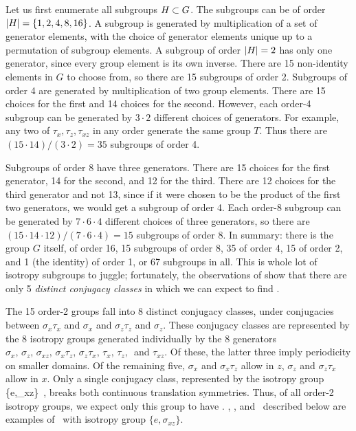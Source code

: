 Let us first enumerate all subgroups $H_{\text{\tiny }} \subset G$.
The subgroups can be of order
$|H_{\text{\tiny }}| = \{1,2,4,8,16\}$.
A subgroup is generated by multiplication of a set of
generator elements, with the choice of
generator elements unique up to a permutation of subgroup
elements.
A subgroup of order $|H_{\text{\tiny }}| =  2$ has only one generator,
since every group element is its own inverse. There are 15
non-identity elements in $G$ to choose from, so there are 15 subgroups
of order 2.
Subgroups of order 4 are generated by multiplication of two
group elements. There are 15 choices for the first and 14
choices for the second. However, each order-4 subgroup
can be generated by $3 \cdot 2$ different choices of generators.
For example, any two of $\tau_x, \tau_z, \tau_{xz}$ in any order
generate the same group $T$. Thus there are $(15 \cdot 14)/(3 \cdot 2) = 35$
subgroups of order 4.

Subgroups of order 8 have three generators.  There are
15 choices for the first generator, 14 for the second, and 12 for the
third. There are 12 choices for the third
generator and not  13, since if it were chosen to be the product of the
first two generators, we would get a subgroup of order 4.
Each order-8 subgroup can be generated
by $7 \cdot 6 \cdot 4$ different choices of three generators, so there are
$(15 \cdot 14 \cdot 12)/(7 \cdot 6 \cdot 4) = 15$ subgroups of order 8.
In summary: there is the group $G$ itself, of order 16,
15 subgroups of order 8, 35 of order 4, 15 of
order 2, and 1 (the identity) of order 1,
or 67 subgroups in all.
This is whole lot of isotropy subgroups to juggle; fortunately,
the observations of  show that there
are only 5 {\em distinct conjugacy classes} in which we can expect
to find \eqva.

The 15 order-2 groups fall into 8 distinct conjugacy
classes, under conjugacies between $\sigma_x \tau_x$ and $\sigma_x$
and $\sigma_z \tau_z$ and $\sigma_z$. These conjugacy classes are
represented by the 8 isotropy groups generated individually by the 8
generators
$\sigma_x,\, \sigma_z,\, \sigma_{xz},\, \sigma_x \tau_z,\,  \sigma_z \tau_x,\,
\tau_x,\, \tau_z,\,$ and $\tau_{xz}$. Of these, the latter three imply
periodicity on smaller domains. Of the remaining five,
$\sigma_x$ and $\sigma_x \tau_z$ allow {\reqva} in $z$,
$\sigma_z$ and $\sigma_z \tau_x$ allow {\reqva} in $x$.
Only a single conjugacy class, represented by the isotropy
group
\beq
  \{e,\sigma_{xz}\}
\,,
breaks both continuous translation symmetries. Thus, of all
order-2  isotropy groups, we expect only this group to have {\eqva}.
\tEQnine, \tEQten, and \tEQelev\ described below are examples of \eqva\
with isotropy group $\{e,\sigma_{xz}\}$.

